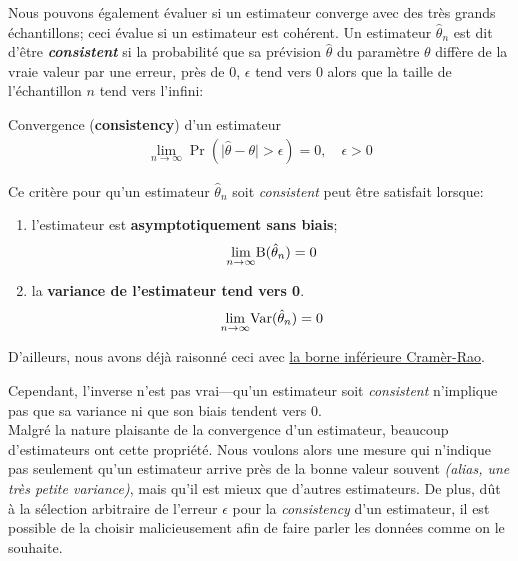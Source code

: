 \documentclass[10pt, french]{article}
\begin{document}
\begin{multicols*}{2}
Nous pouvons également évaluer si un estimateur converge avec des très grands échantillons; ceci évalue si un estimateur est cohérent. Un estimateur $\hat{\theta}_{n}$ est dit d'être \og \textit{\textbf{consistent}} \fg{} si la probabilité que sa prévision $\hat{\theta}$ du paramètre $\theta$ diffère de la vraie valeur par une erreur, près de 0, $\epsilon$ tend vers 0 alors que la taille de l'échantillon $n$ tend vers l'infini:
\begin{algo}{Convergence (\textbf{consistency}) d'un estimateur}
\begin{align*}
	\underset{n \rightarrow \infty}{\lim} \Pr(\big| \hat{\theta} - \theta \big| > \epsilon) = 0, \quad \epsilon > 0
\end{align*}
\end{algo}

Ce critère pour qu'un estimateur $\hat{\theta}_{n}$ soit \og \textit{consistent} \fg{} peut être satisfait lorsque: 
\begin{enumerate}
	\item	l'estimateur est \hypertarget{asympto}{\textbf{asymptotiquement sans biais}};
		\begin{align*}
		\underset{n \rightarrow \infty}{\lim} \text{B}(\hat{\theta}_{n}) = 0
		\end{align*}
	\item	la \textbf{variance de l'estimateur tend vers 0}.
		\begin{align*}
		\underset{n \rightarrow \infty}{\lim} \text{Var}(\hat{\theta}_{n}) = 0
		\end{align*}
\end{enumerate}

D'ailleurs, nous avons déjà raisonné ceci avec \hyperlink{cramer-rao}{la borne inférieure Cramèr-Rao}.

Cependant, l'inverse n'est pas vrai---qu'un estimateur soit \og \textit{consistent} \fg{} n'implique pas que sa variance ni que son biais tendent vers 0.\\

Malgré la nature plaisante de la convergence d'un estimateur, beaucoup d'estimateurs ont cette propriété. 
Nous voulons alors une mesure qui n'indique pas seulement qu'un estimateur arrive près de la bonne valeur souvent \textit{(alias, une très petite variance)}, mais qu'il est mieux que d'autres estimateurs.
De plus, dût à la sélection arbitraire de l'erreur $\epsilon$ pour la \textit{consistency} d'un estimateur, il est possible de la choisir malicieusement afin de faire parler les données comme on le souhaite. 


\end{multicols*}
\end{document}
